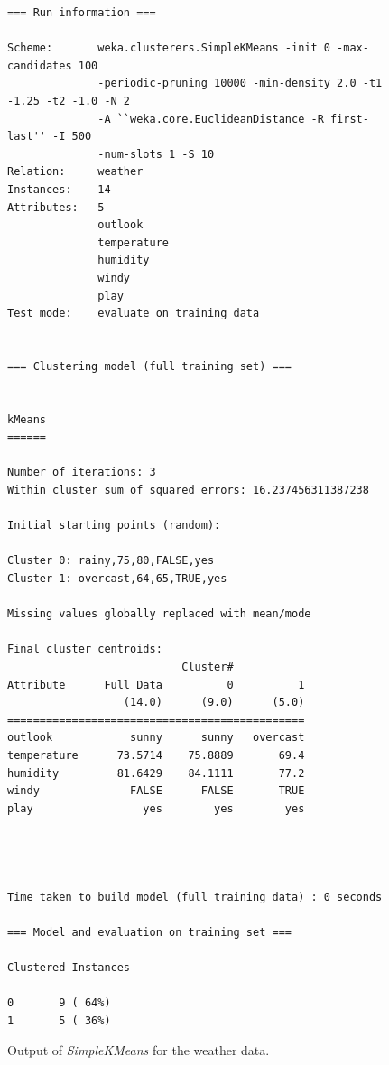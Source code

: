 \begin{figure}[!tp]
\begin{mdframed}[innermargin=-1.0cm]
\begin{Verbatim}[fontsize=\footnotesize]
=== Run information ===

Scheme:       weka.clusterers.SimpleKMeans -init 0 -max-candidates 100
              -periodic-pruning 10000 -min-density 2.0 -t1 -1.25 -t2 -1.0 -N 2 
              -A ``weka.core.EuclideanDistance -R first-last'' -I 500 
              -num-slots 1 -S 10
Relation:     weather
Instances:    14
Attributes:   5
              outlook
              temperature
              humidity
              windy
              play
Test mode:    evaluate on training data


=== Clustering model (full training set) ===


kMeans
======

Number of iterations: 3
Within cluster sum of squared errors: 16.237456311387238

Initial starting points (random):

Cluster 0: rainy,75,80,FALSE,yes
Cluster 1: overcast,64,65,TRUE,yes

Missing values globally replaced with mean/mode

Final cluster centroids:
                           Cluster#
Attribute      Full Data          0          1
                  (14.0)      (9.0)      (5.0)
==============================================
outlook            sunny      sunny   overcast
temperature      73.5714    75.8889       69.4
humidity         81.6429    84.1111       77.2
windy              FALSE      FALSE       TRUE
play                 yes        yes        yes




Time taken to build model (full training data) : 0 seconds

=== Model and evaluation on training set ===

Clustered Instances

0       9 ( 64%)
1       5 ( 36%)
\end{Verbatim}
\end{mdframed}
\caption{\label{fig:kmeans_output}Output of \textit{SimpleKMeans} for the weather data.}
\end{figure}

